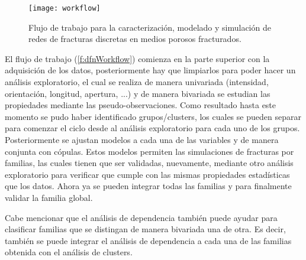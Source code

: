 \begin{figure}[H]
	\centering
	\texttt{[image: workflow]}
\caption{Flujo de trabajo para la caracterizaci\'on, modelado y simulaci\'on de redes de fracturas discretas en medios porosos fracturados.}
	\label{f:dfnWorkflow}
\end{figure}

El flujo de trabajo (\autoref{f:dfnWorkflow}) comienza en la parte superior con la adquisici\'on de los datos, posteriormente hay que limpiarlos para poder hacer un an\'alisis exploratorio, el cual se realiza de manera univariada (intensidad, orientaci\'on, longitud, apertura, ...) y de manera bivariada se estudian las propiedades mediante las pseudo-observaciones. Como resultado hasta este momento se pudo haber identificado grupos/clusters, los cuales se pueden separar para comenzar el ciclo desde al an\'alisis exploratorio para cada uno de los grupos. Posteriormente se ajustan modelos a cada una de las variables y de manera conjunta con c\'opulas. Estos modelos permiten las simulaciones de fracturas por familias, las cuales tienen que ser validadas, nuevamente, mediante otro an\'alisis exploratorio para verificar que cumple con las mismas propiedades estad\'isticas que los datos. Ahora ya se pueden integrar todas las familias y para finalmente validar la familia global.

Cabe mencionar que el an\'alisis de dependencia tambi\'en puede ayudar para clasificar familias que se distingan de manera bivariada una de otra. Es decir, tambi\'en se puede integrar el an\'alisis de dependencia a cada una de las familias obtenida con el an\'alisis de clusters.


